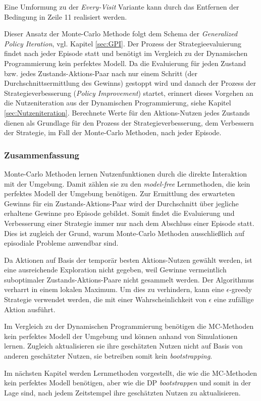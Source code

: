 Eine Umformung zu der \textit{Every-Visit} Variante kann durch das Entfernen der Bedingung in Zeile 11 realisiert werden.
\par 
Dieser Ansatz der Monte-Carlo Methode folgt dem Schema der \textit{Generalized Policy Iteration}, vgl. Kapitel \ref{sec:GPI}. Der Prozess der Strategieevaluierung findet nach jeder Episode statt und benötigt im Vergleich zu der Dynamischen Programmierung kein perfektes Modell. Da die Evaluierung für jeden Zustand bzw. jedes Zustands-Aktions-Paar nach nur einem Schritt (der Durchschnittsermittlung des Gewinns) gestoppt wird und danach der Prozess der Strategieverbesserung (\textit{Policy Improvement}) startet, erinnert dieses Vorgehen an die Nutzeniteration aus der Dynamischen Programmierung, siehe Kapitel \ref{sec:Nutzeniteration}.  Berechnete Werte für den Aktions-Nutzen jedes Zustands dienen als Grundlage für den Prozess der Strategieverbesserung, dem Verbessern der Strategie, im Fall der Monte-Carlo Methoden, nach jeder Episode.

\subsubsection{Zusammenfassung}
Monte-Carlo Methoden lernen Nutzenfunktionen durch die direkte Interaktion mit der Umgebung. Damit zählen sie zu den \textit{model-free} Lernmethoden, die kein perfektes Modell der Umgebung benötigen. Zur Ermittlung des erwarteten Gewinns für ein Zustands-Aktions-Paar wird der Durchschnitt über jegliche erhaltene Gewinne pro Episode gebildet. Somit findet die Evaluierung und Verbesserung einer Strategie immer nur nach dem Abschluss einer Episode statt. Dies ist zugleich der Grund, warum Monte-Carlo Methoden ausschließlich auf episodiale Probleme anwendbar sind.
\par 
Da Aktionen auf Basis der temporär besten Aktions-Nutzen gewählt werden, ist eine ausreichende Exploration nicht gegeben, weil Gewinne vermeintlich suboptimaler Zustands-Aktions-Paare nicht gesammelt werden. Der Algorithmus verharrt in einem lokalen Maximum. Um dies zu verhindern, kann eine $\epsilon$-greedy Strategie verwendet werden, die mit einer Wahrscheinlichkeit von $\epsilon$ eine zufällige Aktion ausführt.
\par 
Im Vergleich zu der Dynamischen Programmierung benötigen die MC-Methoden kein perfektes Modell der Umgebung und können anhand von Simulationen lernen. Zugleich aktualisieren sie ihre geschätzten Nutzen nicht auf Basis von anderen geschätzter Nutzen, sie betreiben somit kein \textit{bootstrapping}. 
\par 
Im nächsten Kapitel werden Lernmethoden vorgestellt, die wie die MC-Methoden kein perfektes Modell benötigen, aber wie die DP \textit{bootstrappen} und somit in der Lage sind, nach jedem Zeitstempel ihre geschätzten Nutzen zu aktualisieren.